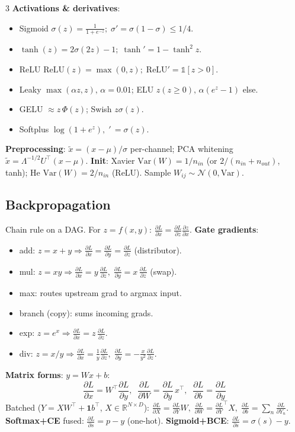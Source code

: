 \documentclass[a4paper,9pt,landscape]{scrartcl}
\newcommand{\R}{\mathbb{R}}
\newcommand{\relu}{\mathrm{ReLU}}
\newcommand{\dd}[2]{\frac{\partial #1}{\partial #2}}
\begin{document}
\begin{multicols*}{3}
\textbf{Activations \& derivatives}:
\begin{itemize}
\item Sigmoid $\sigma(z){=}\frac{1}{1+e^{-z}};\;\sigma'{=}\sigma(1-\sigma)\!\le\!1/4$.
\item $\tanh(z)=2\sigma(2z)-1;\;\tanh'=1-\tanh^2 z$.
\item ReLU $\relu(z){=}\max(0,z);\;\relu'{=}\mathbb{1}[z>0]$.
\item Leaky $\max(\alpha z,z),\,\alpha{=}0.01$; ELU $z(z\!\ge\!0),\,\alpha(e^z{-}1)$ else.
\item GELU $\approx z\,\Phi(z)$;\; Swish $z\sigma(z)$.
\item Softplus $\log(1+e^z),\;'\,=\sigma(z)$.
\end{itemize}

\textbf{Preprocessing}: $\tilde x=(x-\mu)/\sigma$ per-channel; PCA whitening $\tilde x=\Lambda^{-1/2}U^\top(x-\mu)$.
\textbf{Init}: Xavier $\mathrm{Var}(W){=}1/n_{in}$ (or $2/(n_{in}{+}n_{out})$, tanh); He $\mathrm{Var}(W){=}2/n_{in}$ (ReLU). Sample $W_{ij}\sim\mathcal N(0,\mathrm{Var})$.

\subsection{Backpropagation}
Chain rule on a DAG. For $z=f(x,y)$: $\dd{L}{x}=\dd{L}{z}\dd{z}{x}$.
\textbf{Gate gradients}:
\begin{itemize}
\item add: $z=x+y\Rightarrow \dd{L}{x}{=}\dd{L}{y}{=}\dd{L}{z}$ (distributor).
\item mul: $z=xy\Rightarrow \dd{L}{x}=y\,\dd{L}{z},\;\dd{L}{y}=x\,\dd{L}{z}$ (swap).
\item max: routes upstream grad to argmax input.
\item branch (copy): sums incoming grads.
\item exp: $z=e^x\Rightarrow \dd{L}{x}=z\,\dd{L}{z}$.
\item div: $z=x/y\Rightarrow \dd{L}{x}=\tfrac{1}{y}\dd{L}{z},\;\dd{L}{y}=-\tfrac{x}{y^2}\dd{L}{z}$.
\end{itemize}
\textbf{Matrix forms}: $y=Wx+b$:
$$\dd{L}{x}=W^\top\dd{L}{y},\;\;\dd{L}{W}=\dd{L}{y}\,x^\top,\;\;\dd{L}{b}=\dd{L}{y}$$
Batched ($Y=XW^\top+\mathbf 1 b^\top$, $X\!\in\!\R^{N\times D}$):
$\dd{L}{X}=\dd{L}{Y}W,\;\dd{L}{W}=\dd{L}{Y}^\top X,\;\dd{L}{b}=\sum_n\dd{L}{Y_n}$.
\textbf{Softmax+CE} fused: $\dd{L}{s}=p-y$ (one-hot).
\textbf{Sigmoid+BCE}: $\dd{L}{s}=\sigma(s)-y$.


\end{multicols*}
\end{document}
